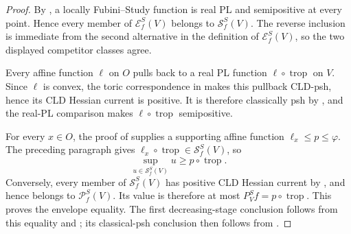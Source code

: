 \begin{proof}
By \cite[Definition~7.8 and~(7.9)]{GJR26}, a locally Fubini--Study
function is real PL and semipositive at every point.  Hence every member of
\(\mathcal E^S_f(V)\) belongs to \(\mathcal S^S_f(V)\).  The reverse
inclusion is immediate from the second alternative in the definition of
\(\mathcal E^S_f(V)\), so the two displayed competitor classes agree.

Every affine function $\ell$ on $O$ pulls back to a real PL function
\(\ell\circ\operatorname{trop}\) on $V$.  Since $\ell$ is convex, the
toric correspondence in \cite[Theorem~5.3.11]{BGJKK25} makes this pullback
CLD-psh, hence its CLD Hessian current is positive.  It is therefore
classically psh by , and the real-PL
comparison  makes
\(\ell\circ\operatorname{trop}\) semipositive.

For every $x\in O$, the proof of
 supplies a supporting
affine function \(\ell_x\leq p\leq\varphi\).  The preceding paragraph gives
\(\ell_x\circ\operatorname{trop}\in\mathcal S^S_f(V)\), so
\[
 \sup_{u\in\mathcal S^S_f(V)}u\geq p\circ\operatorname{trop}.
\]
Conversely, every member of \(\mathcal S^S_f(V)\) has positive CLD Hessian
current by \cite[Theorem~7.14]{GJR26}, and hence belongs to
\(\mathcal P^S_f(V)\).  Its value is therefore at most
\(P^S_Vf=p\circ\operatorname{trop}\).  This proves the envelope equality.
The first decreasing-stage conclusion follows from this equality and
; its classical-psh
conclusion then follows from .
\end{proof}
